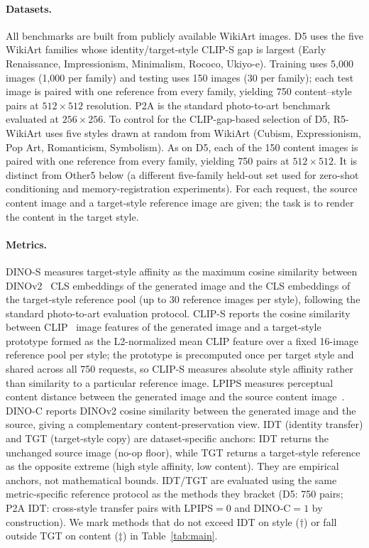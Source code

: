 \documentclass[letterpaper]{article} %
\begin{document}
\paragraph{Datasets.}
All benchmarks are built from publicly available WikiArt images.
D5 uses the five WikiArt families whose identity/target-style CLIP-S gap is largest (Early Renaissance, Impressionism, Minimalism, Rococo, Ukiyo-e). Training uses 5,000 images (1,000 per family) and testing uses 150 images (30 per family); each test image is paired with one reference from every family, yielding 750 content--style pairs at $512\times512$ resolution.
P2A is the standard photo-to-art benchmark evaluated at $256\times256$.
To control for the CLIP-gap-based selection of D5, R5-WikiArt uses five styles drawn at random
from WikiArt (Cubism, Expressionism, Pop Art, Romanticism, Symbolism). As on D5, each of the
150 content images is paired with one reference from every family, yielding 750 pairs at
$512\times512$. It is distinct from Other5 below (a different five-family held-out set used
for zero-shot conditioning and memory-registration experiments).
For each request, the source content image and a target-style reference image are given; the task is to render the content in the target style.

\paragraph{Metrics.}
DINO-S measures target-style affinity as the maximum cosine similarity between DINOv2~\cite{oquab2023dinov2} CLS embeddings of the generated image and the CLS embeddings of the target-style reference pool (up to 30 reference images per style), following the standard photo-to-art evaluation protocol.
CLIP-S reports the cosine similarity between CLIP~\cite{radford2021clip} image features of the generated image and a target-style prototype formed as the L2-normalized mean CLIP feature over a fixed 16-image reference pool per style; the prototype is precomputed once per target style and shared across all 750 requests, so CLIP-S measures absolute style affinity rather than similarity to a particular reference image.
LPIPS measures perceptual content distance between the generated image and the source content image~\cite{zhang2018unreasonable}.
DINO-C reports DINOv2 cosine similarity between the generated image and the source, giving a complementary content-preservation view.
IDT (identity transfer) and TGT (target-style copy) are dataset-specific anchors: IDT returns the unchanged source image (no-op floor), while TGT returns a target-style reference as the opposite extreme (high style affinity, low content). They are empirical anchors, not mathematical bounds.
IDT/TGT are evaluated using the same metric-specific reference protocol as the methods they bracket (D5: 750 pairs; P2A IDT: cross-style transfer pairs with LPIPS${=}0$ and DINO-C${=}1$ by construction).
We mark methods that do not exceed IDT on style ($\dagger$) or fall outside TGT on content ($\ddagger$) in Table~\ref{tab:main}.
\end{document}
